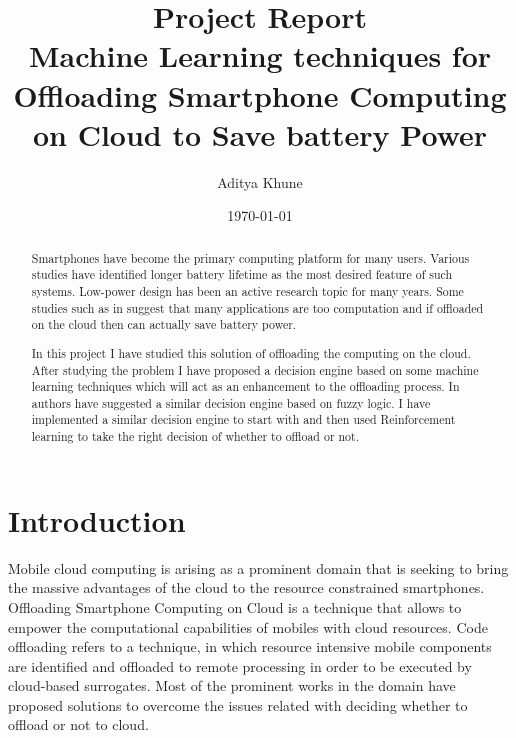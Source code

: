 \documentclass{article}
\begin{document}
\title{Project Report\\
Machine Learning techniques for\\
Offloading Smartphone Computing on Cloud to Save battery Power}
\author{Aditya Khune}
\date{\today}  %
\maketitle


\tableofcontents


\begin{abstract}
Smartphones have become the primary computing platform for many users. Various studies have identified longer battery lifetime as the most desired
feature of such systems. Low-power design has been an active research topic for
many years. Some studies such as in \cite{kumar2010cloud} suggest that many applications are too computation and if offloaded on the cloud then can
actually save battery power.\par
In this project I have studied this solution of offloading the computing on the cloud. After studying the problem I have proposed a decision engine based on some machine learning techniques which will act as an enhancement to the offloading process. In \cite{flores2013adaptive} authors have suggested a similar decision engine based on fuzzy logic. I have implemented a similar decision engine to start with and then used Reinforcement learning to take the right decision of whether to offload or not.
\end{abstract}


\section{Introduction}
Mobile cloud computing is arising as a prominent domain
that is seeking to bring the massive advantages of the cloud
to the resource constrained smartphones. 
Offloading Smartphone Computing on Cloud is a technique that allows to empower the computational capabilities
of mobiles with cloud resources. Code offloading refers to a technique, in which resource intensive mobile components are identified and offloaded to remote processing in order to be executed by cloud-based surrogates. Most of the prominent works in the domain have proposed solutions to overcome the issues related with deciding whether to offload or
not to cloud.
\end{document}

